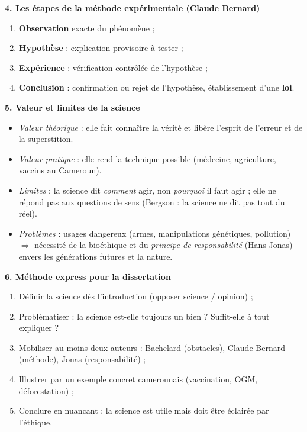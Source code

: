 \documentclass[11pt]{article}
\newcommand{\cle}[1]{{\popxbold\color{popdark}#1}}
\begin{document}
\begin{bilan}
\textbf{4. Les \'etapes de la m\'ethode exp\'erimentale (Claude Bernard)}
\begin{enumerate}
\item \textbf{Observation} exacte du ph\'enom\`ene ;
\item \textbf{Hypoth\`ese} : explication provisoire \`a tester ;
\item \textbf{Exp\'erience} : v\'erification contr\^ol\'ee de l'hypoth\`ese ;
\item \textbf{Conclusion} : confirmation ou rejet de l'hypoth\`ese, \'etablissement d'une \textbf{loi}.
\end{enumerate}

\textbf{5. Valeur et limites de la science}
\begin{itemize}
\item \emph{Valeur th\'eorique} : elle fait conna\^itre la v\'erit\'e et lib\`ere l'esprit de l'erreur et de la superstition.
\item \emph{Valeur pratique} : elle rend la technique possible (m\'edecine, agriculture, vaccins au Cameroun).
\item \emph{Limites} : la science dit \emph{comment} agir, non \emph{pourquoi} il faut agir ; elle ne r\'epond pas aux questions de sens (Bergson : la science ne dit pas tout du r\'eel).
\item \emph{Probl\`emes} : usages dangereux (armes, manipulations g\'en\'etiques, pollution) $\Rightarrow$ n\'ecessit\'e de la \cle{bio\'ethique} et du \emph{principe de responsabilit\'e} (Hans Jonas) envers les g\'en\'erations futures et la nature.
\end{itemize}

\textbf{6. M\'ethode express pour la dissertation}
\begin{enumerate}
\item D\'efinir la science d\`es l'introduction (opposer science / opinion) ;
\item Probl\'ematiser : la science est-elle toujours un bien ? Suffit-elle \`a tout expliquer ?
\item Mobiliser au moins deux auteurs : Bachelard (obstacles), Claude Bernard (m\'ethode), Jonas (responsabilit\'e) ;
\item Illustrer par un exemple concret camerounais (vaccination, OGM, d\'eforestation) ;
\item Conclure en nuancant : la science est utile mais doit \^etre \'eclair\'ee par l'\'ethique.
\end{enumerate}
\end{bilan}
\end{document}
